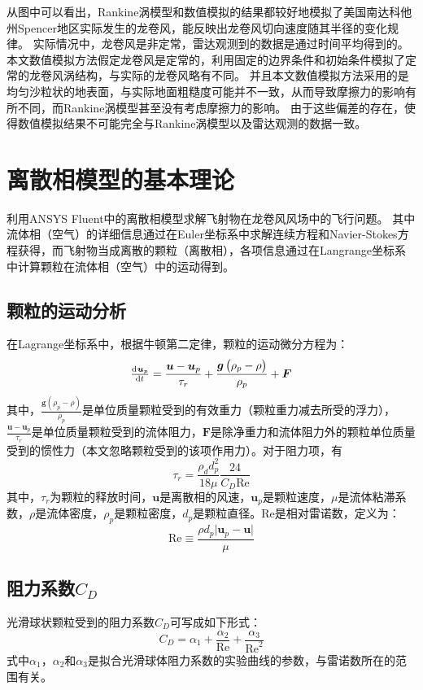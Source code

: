 \documentclass{ctexart}
\begin{document}
从图中可以看出，Rankine涡模型和数值模拟的结果都较好地模拟了美国南达科他州Spencer地区实际发生的龙卷风，能反映出龙卷风切向速度随其半径的变化规律。
实际情况中，龙卷风是非定常，雷达观测到的数据是通过时间平均得到的。
本文数值模拟方法假定龙卷风是定常的，利用固定的边界条件和初始条件模拟了定常的龙卷风涡结构，与实际的龙卷风略有不同。
并且本文数值模拟方法采用的是均匀沙粒状的地表面，与实际地面粗糙度可能并不一致，从而导致摩擦力的影响有所不同，而Rankine涡模型甚至没有考虑摩擦力的影响。
由于这些偏差的存在，使得数值模拟结果不可能完全与Rankine涡模型以及雷达观测的数据一致。


\section{离散相模型的基本理论}
利用ANSYS Fluent\textregistered 中的离散相模型求解飞射物在龙卷风风场中的飞行问题\cite{fluent2011}。
其中流体相（空气）的详细信息通过在Euler坐标系中求解连续方程和Navier-Stokes方程获得，而飞射物当成离散的颗粒（离散相），各项信息通过在Langrange坐标系中计算颗粒在流体相（空气）中的运动得到。

\subsection{颗粒的运动分析}
在Lagrange坐标系中，根据牛顿第二定律，颗粒的运动微分方程为\cite{fluent2011}：
\begin{equation}\label{eqn:ode_particle}
\od{\bm{u}_p}{t} = \frac{\bm{u}-\bm{u}_p}{\tau_r} + \frac{\bm{g} \left( \rho_p - \rho \right)}{\rho_p} + \bm{F}
\end{equation}
其中，$\frac{\bm{g} \left( \rho_p - \rho \right)}{\rho_p}$是单位质量颗粒受到的有效重力（颗粒重力减去所受的浮力），$\frac{\bm{u}-\bm{u}_p}{\tau_r}$是单位质量颗粒受到的流体阻力，$\bm{F}$是除净重力和流体阻力外的颗粒单位质量受到的惯性力（本文忽略颗粒受到的该项作用力）。对于阻力项，有
\begin{equation}\label{eqn:tau_r}
\tau_r=\frac{\rho_d d_p^2}{18 \mu} \frac{24}{C_D \mathrm{Re}}
\end{equation}
其中，$\tau_r$为颗粒的释放时间，$\bm{u}$是离散相的风速，$\bm{u}_p$是颗粒速度，$\mu$是流体粘滞系数，$\rho$是流体密度，$\rho_p$是颗粒密度，$d_p$是颗粒直径。$\mathrm{Re}$是相对雷诺数，定义为：
\begin{equation}
\mathrm{Re} \equiv \frac{\rho d_p\lvert \bm{u}_p-\bm{u} \rvert}{\mu}
\end{equation}

\subsection{阻力系数$C_D$}
光滑球状颗粒受到的阻力系数$C_D$可写成如下形式\cite{morsi1972}：
\begin{equation}
C_D = \alpha_1 + \frac{\alpha_2}{\mathrm{Re}} + \frac{\alpha_3}{\mathrm{Re}^2}
\end{equation}
式中$\alpha_1$，$\alpha_2$和$\alpha_3$是拟合光滑球体阻力系数的实验曲线的参数，与雷诺数所在的范围有关。
\end{document}
